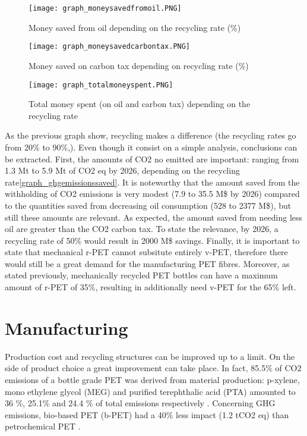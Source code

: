 \documentclass[twoside,a4paper,12pt]{report}
\begin{document}
\begin{figure} %
    \centering
    \texttt{[image: graph\_moneysavedfromoil.PNG]}
    \caption{Money saved from oil depending on the recycling rate (\%)}
     \label{grpah_moneysavedoil} 
\end{figure}

\begin{figure} %
    \centering
    \texttt{[image: graph\_moneysavedcarbontax.PNG]}
    \caption{Money saved on carbon tax depending on recycling rate (\%)}
     \label{graph_moneysavedghg} 
\end{figure}

\begin{figure} 
    \centering
    \texttt{[image: graph\_totalmoneyspent.PNG]}
    \caption{Total money spent (on oil and carbon tax) depending on the recycling rate}
     \label{grpah_totalmoneyspent} 
\end{figure}

As the previous graph show, recycling makes a difference (the recycling rates go from 20\% to 90\%,). Even though it consist on a  simple analysis, conclusions can be extracted. First, the amounts of CO2 no emitted are important: ranging from 1.3 Mt to 5.9 Mt of CO2 eq by 2026, depending on the recycling rate\ref{graph_ghgemissionssaved}. It is noteworthy that the amount saved from the withholding of CO2 emissions is very modest (7.9 to 35.5 M\$ by 2026) compared to the quantities saved from decreasing oil consumption (528 to 2377 M\$), but still these amounts are relevant. As expected, the amount saved from needing less oil are greater than the CO2 carbon tax. To state the relevance, by 2026, a recycling rate of 50\% would result in 2000 M\$ savings. Finally, it is important to state that mechanical r-PET cannot subsitute entirely v-PET, therefore there would still be a great demand for the manufacturing PET fibres. Moreover, as stated previously, mechanically recycled PET bottles can have a maximum amount of r-PET of 35\%, resulting in additionally need v-PET for the 65\% left.


\section{Manufacturing}
Production cost and recycling structures can be improved up to a limit. On the side of product choice a great improvement can take place. In fact, 85.5\% of CO2 emissions of a bottle grade PET was derived from material production: p-xylene, mono ethylene glycol (MEG) and purified terephthalic acid (PTA) amounted to 36 \%, 25.1\% and 24.4 \% of total emissions respectively \cite{PEPETecoprofile}. Concerning GHG emissions, bio-based PET (b-PET) had a 40\% less impact (1.2 tCO2 eq) than petrochemical PET \cite{Shen2011}.
\end{document}
